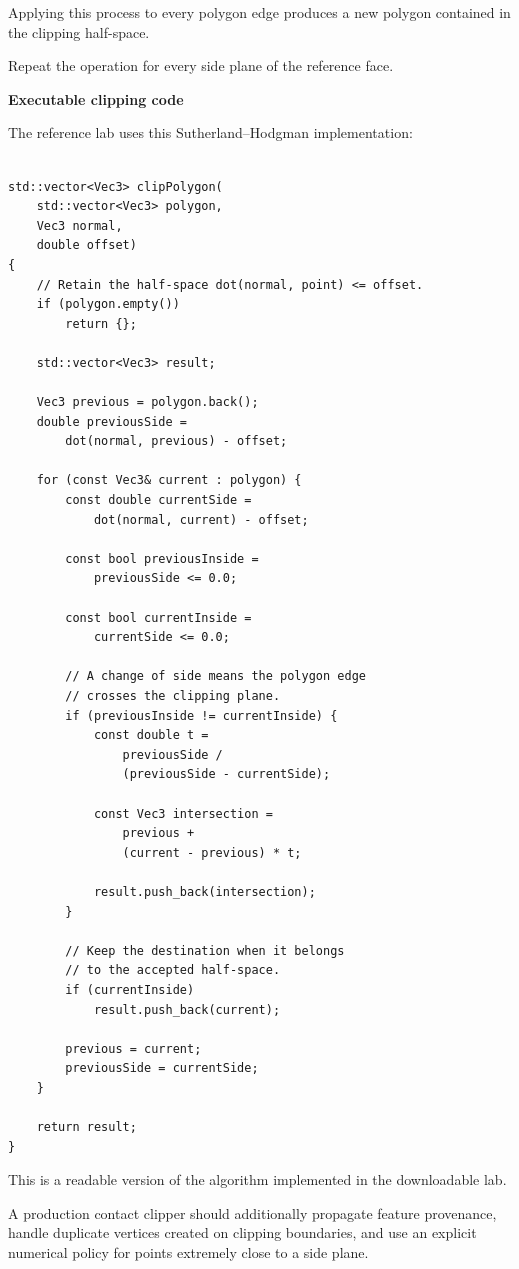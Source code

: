 Applying this process to every polygon edge produces a new polygon contained in the clipping half-space.

Repeat the operation for every side plane of the reference face.

\textbf{Executable clipping code}

The reference lab uses this Sutherland--Hodgman implementation:

\begin{verbatim}

std::vector<Vec3> clipPolygon(
    std::vector<Vec3> polygon,
    Vec3 normal,
    double offset)
{
    // Retain the half-space dot(normal, point) <= offset.
    if (polygon.empty())
        return {};

    std::vector<Vec3> result;

    Vec3 previous = polygon.back();
    double previousSide =
        dot(normal, previous) - offset;

    for (const Vec3& current : polygon) {
        const double currentSide =
            dot(normal, current) - offset;

        const bool previousInside =
            previousSide <= 0.0;

        const bool currentInside =
            currentSide <= 0.0;

        // A change of side means the polygon edge
        // crosses the clipping plane.
        if (previousInside != currentInside) {
            const double t =
                previousSide /
                (previousSide - currentSide);

            const Vec3 intersection =
                previous +
                (current - previous) * t;

            result.push_back(intersection);
        }

        // Keep the destination when it belongs
        // to the accepted half-space.
        if (currentInside)
            result.push_back(current);

        previous = current;
        previousSide = currentSide;
    }

    return result;
}
\end{verbatim}

This is a readable version of the algorithm implemented in the downloadable lab.

A production contact clipper should additionally propagate feature provenance, handle duplicate vertices created on clipping boundaries, and use an explicit numerical policy for points extremely close to a side plane.

